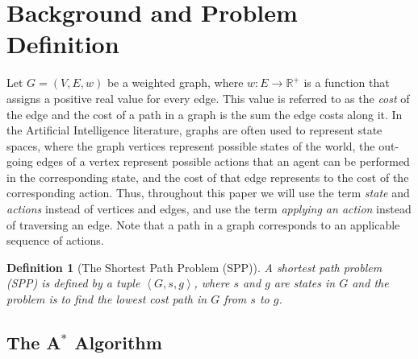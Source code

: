 \documentclass{aicom2e}
\newtheorem{definition}{Definition}
\newcommand{\astar}{A$^*$}
\newcommand{\tuple}[1]{\ensuremath{\left \langle #1 \right \rangle }}
\begin{document}
\section{Background and Problem Definition}


Let $G=(V,E,w)$ be a weighted graph, where $w:E\rightarrow \mathbb{R}^+$ is a function that assigns a positive real value for every edge. This value is referred to as the {\em cost} of the edge and the cost of a path in a graph is  the sum the edge costs along it. 
In the Artificial Intelligence literature, graphs are often used to represent state spaces, 
where the graph vertices represent possible states of the world, the out-going edges of a vertex represent possible actions that an agent can be performed in the corresponding state, and the cost of that edge represents to the cost of the corresponding action. 
Thus, throughout this paper we will use the term {\em state} and {\em actions} instead of vertices and edges, and use the term {\em applying an action} instead of traversing an edge. Note that a path in a graph corresponds to an applicable sequence of actions. 

\begin{definition}[The Shortest Path Problem (SPP)]
A shortest path problem (SPP) is defined by a tuple $\tuple{G,s, g}$, 
where $s$ and $g$ are states in $G$ and the problem is to find the lowest cost path in $G$ from $s$ to $g$. 
\end{definition}

\subsection{The \astar{} Algorithm}
\end{document}
